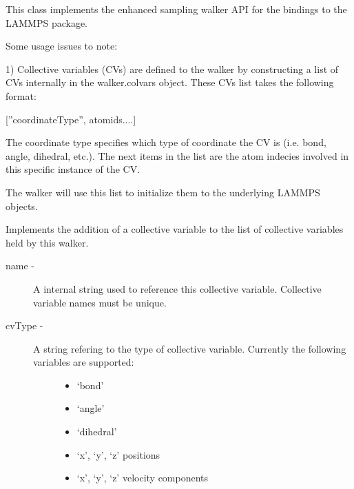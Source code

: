 \documentclass[letterpaper,10pt,english]{sphinxmanual}
\begin{document}
\begin{fulllineitems}
\label{walker_api/walker_api.doc:lammpsWalker.lammpsWalker}
This class implements the enhanced sampling walker API for the bindings to the LAMMPS package.

Some usage issues to note:

1) Collective variables (CVs) are defined to the walker by constructing a list of
CVs internally in the walker.colvars object. These CVs list takes the following
format:

{[}''coordinateType'', atomids....{]}

The coordinate type specifies which type of coordinate the CV is
(i.e. bond, angle, dihedral, etc.). The next items in the list are the atom
indecies involved in this specific instance of the CV.

The walker will use this list to initialize them to the underlying LAMMPS objects.

\begin{fulllineitems}
\label{walker_api/walker_api.doc:lammpsWalker.lammpsWalker.addColvars}
Implements the addition of a collective variable to the list of collective variables held by this walker.
\begin{description}
\item[{name -}] \leavevmode
A internal string used to reference this collective variable. Collective variable names must be unique.

\item[{cvType -}] \leavevmode\begin{description}
\item[{A string refering to the type of collective variable. Currently the following variables are supported:}] \leavevmode\begin{itemize}
\item {} 
`bond'

\item {} 
`angle'

\item {} 
`dihedral'

\item {} 
`x', `y', `z' positions

\item {} 
`x', `y', `z' velocity components


\end{itemize}
\end{description}
\end{description}
\end{fulllineitems}
\end{fulllineitems}
\end{document}
